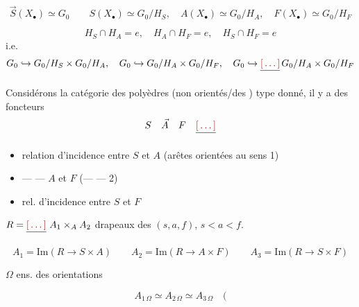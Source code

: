 \documentclass[11pt,a4paper]{article}
\begin{document}


\[
\vec{S}(X_\bullet) \simeq G_0 \qquad
S(X_\bullet) \simeq G_0/H_S, \quad A(X_\bullet) \simeq G_0/H_A, \quad
F(X_\bullet) \simeq G_0/H_F
\]


\[
H_S \cap H_A = e, \quad H_A \cap H_F = e, \quad H_S \cap H_F = e
\]
i.e.
\[
G_0 \hookrightarrow G_0/H_S \times G_0/H_A, \quad
G_0 \hookrightarrow G_0/H_A \times G_0/H_F, \quad
G_0 \hookrightarrow \struck{\ill{}}\,G_0/H_A \times G_0/H_F
\]


Considérons la catégorie des polyèdres (non orientés/des \ill{}) \ill{}
type donné, il y a des foncteurs
\[
S \quad \vec{A} \quad F \quad \struck{\ill{}}
\]


\begin{itemize}
\item[$A_1$] relation d'incidence entre $S$ et $A$ (arêtes orientées au
sens 1)
\item[$A_2$] --- --- $A$ et $F$ (--- --- 2)
\item[$A_3$] rel. d'incidence entre $S$ et $F$
\end{itemize}

$R = \struck{\ill{}}\ A_1 \times_A A_2$ \quad
{} drapeaux des
$(s, a, f)$, $s < a < f$.



\[
A_1 = \mathrm{Im}(R \to S \times A) \qquad
A_2 = \mathrm{Im}(R \to A \times F) \qquad
A_3 = \mathrm{Im}(R \to S \times F)
\]

$\Omega$ ens. des orientations

\[
A_{1\,\Omega} \simeq A_{2\,\Omega} \simeq A_{3\,\Omega} \quad (
\]
\end{document}
